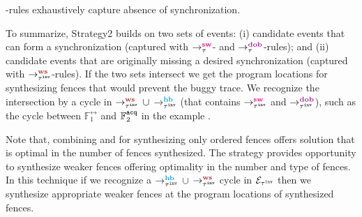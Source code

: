 \begin{theorem} \label{thm:ws exhaustive}
	\lws-rules exhaustively capture absence of synchronization.
\end{theorem}

To summarize, Strategy2 builds on two sets of events:
(i) candidate events that can form a synchronization 
(captured with $\setSW$- and $\setDOB$-rules); and
(ii) candidate events that are originally missing a desired
synchronization (captured with $\setWS$-rules).
If the two sets intersect we get the program locations
for synthesizing fences that would prevent the buggy trace.
We recognize the intersection by a cycle in  
$\ws{\inv{\tau}}{}{}$ $\cup$ $\hb{\inv{\tau}}{}{}$ 
(that contains $\sw{\inv{\tau}}{}{}$ and $\dob{\inv{\tau}}{}{}$), 
such as the cycle between $\mathbb{F}^\rel_1$ and 
$\mathbb{F}^\texttt{acq}_2$ in the example .

Note that, combining \sfence and \wfence for synthesizing only
\sc ordered fences offers solution that is optimal in the number
of fences synthesized. 
%
The \wfence strategy provides opportunity to synthesize weaker
fences offering optimality in the number and type of fences.
%
In this technique if we recognize a $\hb{\inv{\tau}}{}{}$ $\cup$ 
$\ws{\inv{\tau}}{}{}$ cycle in $\mathcal{E}_{{\tau}^{\mathtt{inv}}}$ then we
synthesize appropriate weaker fences at the program locations  
of synthesized fences.
